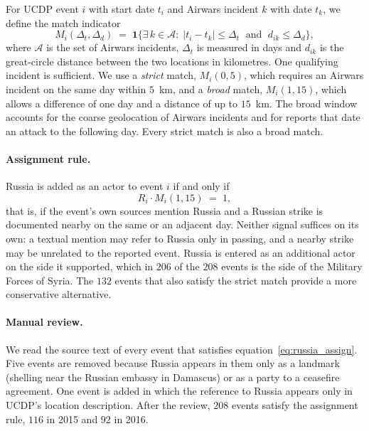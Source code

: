For UCDP event $i$ with start date $t_i$ and Airwars incident $k$ with date
$t_k$, we define the match indicator
\begin{equation}
  M_i(\Delta_t,\Delta_d) \;=\; \mathbf{1}\bigl\{\exists\, k \in \mathcal{A}:
  \; |t_i - t_k| \le \Delta_t \;\text{ and }\; d_{ik} \le \Delta_d \bigr\},
  \label{eq:russia_match}
\end{equation}
where $\mathcal{A}$ is the set of Airwars incidents, $\Delta_t$ is measured in
days and $d_{ik}$ is the great-circle distance between the two locations in
kilometres. One qualifying incident is sufficient. We use a \emph{strict}
match, $M_i(0,5)$, which requires an Airwars incident on the same day within
$5$~km, and a \emph{broad} match, $M_i(1,15)$, which allows a difference of
one day and a distance of up to $15$~km. The broad window accounts for the
coarse geolocation of Airwars incidents and for reports that date an attack to
the following day. Every strict match is also a broad match.

\paragraph{Assignment rule.}
Russia is added as an actor to event $i$ if and only if
\begin{equation}
  R_i \cdot M_i(1,15) \;=\; 1,
  \label{eq:russia_assign}
\end{equation}
that is, if the event's own sources mention Russia and a Russian strike is
documented nearby on the same or an adjacent day. Neither signal suffices on
its own: a textual mention may refer to Russia only in passing, and a nearby
strike may be unrelated to the reported event. Russia is entered as an
additional actor on the side it supported, which in $206$ of the $208$ events
is the side of the Military Forces of Syria. The $132$ events that also
satisfy the strict match provide a more conservative alternative.

\paragraph{Manual review.}
We read the source text of every event that satisfies
equation~\eqref{eq:russia_assign}. Five events are removed because Russia
appears in them only as a landmark (shelling near the Russian embassy in
Damascus) or as a party to a ceasefire agreement. One event is added in which
the reference to Russia appears only in UCDP's location description. After
the review, $208$ events satisfy the assignment rule, $116$ in 2015 and $92$
in 2016.

